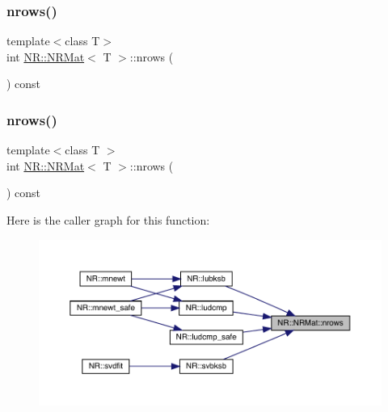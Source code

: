 \mbox{\label{classNR_1_1NRMat_aacebd802ca3dea0e0079a8dd27f7102c}} 
\subsubsection{\texorpdfstring{nrows()}{nrows()}\hspace{0.1cm}{\footnotesize\ttfamily [1/2]}}
{\footnotesize\ttfamily template$<$class T$>$ \\
int \mbox{\hyperlink{classNR_1_1NRMat}{N\+R\+::\+N\+R\+Mat}}$<$ T $>$\+::nrows (\begin{DoxyParamCaption}{ }\end{DoxyParamCaption}) const\hspace{0.3cm}{\ttfamily [inline]}}

\mbox{\label{classNR_1_1NRMat_aacebd802ca3dea0e0079a8dd27f7102c}} 
\subsubsection{\texorpdfstring{nrows()}{nrows()}\hspace{0.1cm}{\footnotesize\ttfamily [2/2]}}
{\footnotesize\ttfamily template$<$class T $>$ \\
int \mbox{\hyperlink{classNR_1_1NRMat}{N\+R\+::\+N\+R\+Mat}}$<$ T $>$\+::nrows (\begin{DoxyParamCaption}{ }\end{DoxyParamCaption}) const\hspace{0.3cm}{\ttfamily [inline]}}

Here is the caller graph for this function\+:\nopagebreak
\begin{figure}[H]
\begin{center}
\leavevmode
\includegraphics[width=350pt]{da/d92/classNR_1_1NRMat_aacebd802ca3dea0e0079a8dd27f7102c_icgraph}
\end{center}
\end{figure}
\mbox{\label{classNR_1_1NRMat_a3cb82862ba2a5cff2516bd1c7ff517ef}} 
